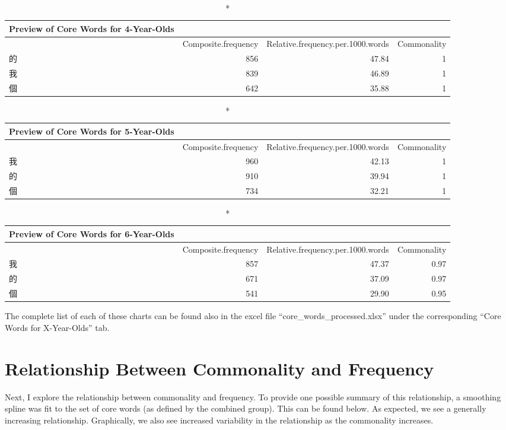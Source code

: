 \documentclass[
]{article}
\begin{document}
\begin{longtable}{l|rrr}
\caption*{
{\large Preview of Core Words for 4-Year-Olds}
} \\ 
\toprule
\multicolumn{1}{l}{} & Composite.frequency & Relative.frequency.per.1000.words & Commonality \\ 
\midrule\addlinespace[2.5pt]
的 & 856 & 47.84 & 1 \\ 
我 & 839 & 46.89 & 1 \\ 
個 & 642 & 35.88 & 1 \\ 
\bottomrule
\end{longtable}
\begin{longtable}{l|rrr}
\caption*{
{\large Preview of Core Words for 5-Year-Olds}
} \\ 
\toprule
\multicolumn{1}{l}{} & Composite.frequency & Relative.frequency.per.1000.words & Commonality \\ 
\midrule\addlinespace[2.5pt]
我 & 960 & 42.13 & 1 \\ 
的 & 910 & 39.94 & 1 \\ 
個 & 734 & 32.21 & 1 \\ 
\bottomrule
\end{longtable}
\begin{longtable}{l|rrr}
\caption*{
{\large Preview of Core Words for 6-Year-Olds}
} \\ 
\toprule
\multicolumn{1}{l}{} & Composite.frequency & Relative.frequency.per.1000.words & Commonality \\ 
\midrule\addlinespace[2.5pt]
我 & 857 & 47.37 & 0.97 \\ 
的 & 671 & 37.09 & 0.97 \\ 
個 & 541 & 29.90 & 0.95 \\ 
\bottomrule
\end{longtable}

The complete list of each of these charts can be found also in the excel
file ``core\_words\_processed.xlsx'' under the corresponding ``Core
Words for X-Year-Olds'' tab.

\hypertarget{relationship-between-commonality-and-frequency}{%
\section{Relationship Between Commonality and
Frequency}\label{relationship-between-commonality-and-frequency}}

Next, I explore the relationship between commonality and frequency. To
provide one possible summary of this relationship, a smoothing spline
was fit to the set of core words (as defined by the combined group).
This can be found below. As expected, we see a generally increasing
relationship. Graphically, we also see increased variability in the
relationship as the commonality increases.
\end{document}
